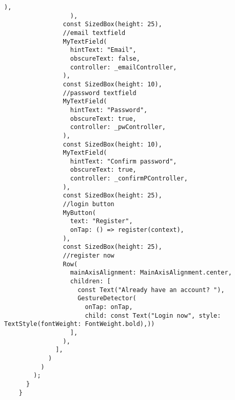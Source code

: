 \begin{lstlisting}[style=pythonstyle,caption={Codice del register\_page.py}, label={lst:register}]
                    ),
                  ),
                const SizedBox(height: 25),
                //email textfield
                MyTextField(
                  hintText: "Email",
                  obscureText: false,
                  controller: _emailController,
                ),
                const SizedBox(height: 10),
                //password textfield
                MyTextField(
                  hintText: "Password",
                  obscureText: true,
                  controller: _pwController,
                ),
                const SizedBox(height: 10),
                MyTextField(
                  hintText: "Confirm password", 
                  obscureText: true, 
                  controller: _confirmPController,
                ),
                const SizedBox(height: 25),
                //login button
                MyButton(
                  text: "Register",
                  onTap: () => register(context),
                ),
                const SizedBox(height: 25),
                //register now
                Row(
                  mainAxisAlignment: MainAxisAlignment.center,
                  children: [
                    const Text("Already have an account? "),
                    GestureDetector(
                      onTap: onTap,
                      child: const Text("Login now", style: TextStyle(fontWeight: FontWeight.bold),))
                  ],
                ),
              ],
            )
          )
        );
      }
    }
    \end{lstlisting}

